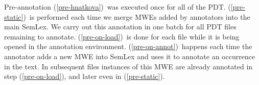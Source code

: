 Pre-annotation (\ref{pre-hnatkova})~was executed once for all of the PDT. (\ref{pre-static})~is performed each time we merge MWEs added by annotators into the main SemLex. We carry out this annotation in one batch for all PDT files remaining to annotate. (\ref{pre-on-load})~is done for each file while it is being opened in the annotation environment. 
(\ref{pre-on-annot})~happens each time the annotator adds a new MWE into SemLex and uses it to annotate an occurrence in the text. In subsequent files instances of this MWE are already annotated in step (\ref{pre-on-load}), and later even in (\ref{pre-static}).
 

